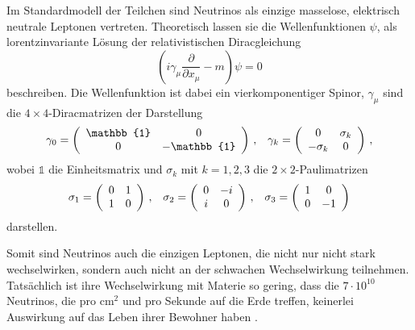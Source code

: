 Im Standardmodell der Teilchen sind Neutrinos als einzige masselose, elektrisch neutrale Leptonen vertreten.
Theoretisch lassen sie die Wellenfunktionen $\psi$, als lorentzinvariante Lösung der relativistischen Diracgleichung
\begin{equation}
    \left(i \gamma_\mu \frac{\partial}{\partial x_\mu} - m \right) \psi = 0
    \label{eq:dirac}
\end{equation}
beschreiben.
Die Wellenfunktion ist dabei ein vierkomponentiger Spinor, $\gamma_\mu$ sind die $4 \times 4$-Diracmatrizen der Darstellung
\begin{align}
    \gamma_0 = \left( \begin{array}{c c}
        \mathbb{1} & 0          \\ 
        0          & -\mathbb{1} \\ 
        \end{array}\right) \,,
    &&
    \gamma_k = \left( \begin{array}{c c}
        0           & \sigma_k  \\ 
        -\sigma_k   & 0         \\ 
        \end{array}\right) \,,
    \label{eq:gammamatrizen}
\end{align}
wobei $\mathbb{1}$ die Einheitsmatrix und $\sigma_k$ mit $k = 1, 2, 3$ die $2 \times 2$-Paulimatrizen
\begin{align}
    \sigma_1 = \left( \begin{array}{c c}
        0 & 1   \\ 
        1 & 0   \\ 
        \end{array}\right) \,,
    &&
    \sigma_2 = \left( \begin{array}{c c}
        0           & -i  \\ 
        i  & 0         \\ 
        \end{array}\right) \,,
    &&
    \sigma_3 = \left( \begin{array}{c c}
        1           & 0 \\ 
        0   & -1         \\ 
        \end{array}\right)
\end{align}
darstellen. 

Somit sind Neutrinos auch die einzigen Leptonen, die nicht nur nicht stark wechselwirken, sondern auch nicht an der schwachen Wechselwirkung teilnehmen.
Tatsächlich ist ihre Wechselwirkung mit Materie so gering, dass die $7 \cdot 10^{10}$  Neutrinos, die pro $\si{\centi\meter}^2$ und pro Sekunde auf die Erde treffen, keinerlei Auswirkung
auf das Leben ihrer Bewohner haben \cite[S. ~133]{grupen}. 

